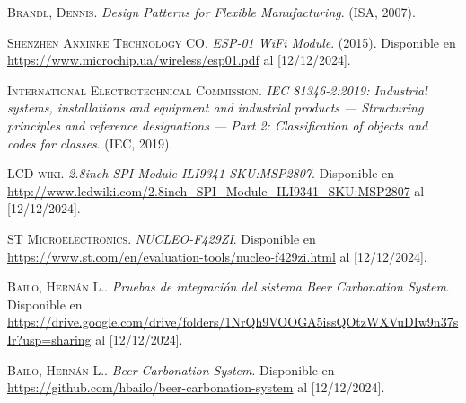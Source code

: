 \renewcommand{\refname}{Referencias}

\begin{thebibliography}{0}

  \textsc{Brandl, Dennis}. \textit{Design Patterns for Flexible Manufacturing}. (ISA, 2007).

  \textsc{Shenzhen Anxinke Technology CO}. \textit{ESP-01 WiFi Module}. (2015). Disponible en \url{https://www.microchip.ua/wireless/esp01.pdf} al [12/12/2024].

  \textsc{International Electrotechnical Commission}. \textit{IEC 81346-2:2019: Industrial systems, installations and equipment and industrial products — Structuring principles and reference designations — Part 2: Classification of objects and codes for classes}. (IEC, 2019).

  \textsc{LCD wiki}. \textit{2.8inch SPI Module ILI9341 SKU:MSP2807}. Disponible en \url{http://www.lcdwiki.com/2.8inch_SPI_Module_ILI9341_SKU:MSP2807} al [12/12/2024].
  
  \textsc{ST Microelectronics}. \textit{NUCLEO-F429ZI}. Disponible en \url{https://www.st.com/en/evaluation-tools/nucleo-f429zi.html} al [12/12/2024].

  \textsc{Bailo, Hernán L.}. \textit{Pruebas de integración del sistema Beer Carbonation System}. Disponible en \url{https://drive.google.com/drive/folders/1NrQh9VOOGA5issQOtzWXVuDIw9n37sIr?usp=sharing} al [12/12/2024].
  
  \textsc{Bailo, Hernán L.}. \textit{Beer Carbonation System}. Disponible en \url{https://github.com/hbailo/beer-carbonation-system} al [12/12/2024].
\end{thebibliography}

